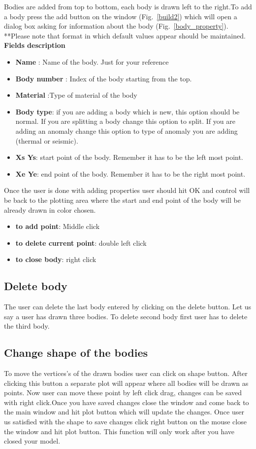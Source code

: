 \documentclass[12pt]{article}
\begin{document}
Bodies are added from top to bottom, each body is drawn left to the right.To add a body press the add button on the window (Fig.~\ref{build2}) which will open a dialog box asking for information about the body (Fig.~\ref{body_property}).\\ 
**Please note that format in which default values appear should be maintained.
\textbf{Fields description}
\begin{itemize}
\item \textbf{Name}     : Name of the body. Just for your reference
\item \textbf{Body number} : Index of the body starting from the top.
\item \textbf{Material} :Type of material of the body
\item \textbf{Body type}: if you are adding a body which is new, this option should be normal. If you are splitting a body change this option to split. If you are adding an anomaly change this option to type of anomaly you are adding (thermal or seismic).
\item \textbf{Xs Ys}: start point of the body. Remember it has to be the left most point. 
\item \textbf{Xe Ye}: end point of the body. Remember it has to be the right most point. 
\end{itemize}
Once the user is done with adding properties user should hit OK and control will be back to the plotting area where the start and end point of the body will be already drawn in color chosen.
\begin{itemize}
\item \textbf{to add point}: Middle click
\item \textbf{to delete current point}: double left click
\item \textbf{to close body}: right click
\end{itemize} 
\subsection{Delete body}
The user can delete the last body entered by clicking on the delete button. Let us say a user has drawn three bodies. To delete second body first user has to delete the third body.
\subsection{Change shape of the bodies}
To move the vertices's of the drawn bodies user can click on shape button. After clicking this button a separate plot will appear where all bodies will be drawn as points. Now user can move these point by left click drag, changes can be saved with right click.Once you have saved changes close the window and come back to the main window and hit plot button which will update the changes. Once user us satisfied with the shape to save changes click right button on the mouse close the window and hit plot button. This function will only work after you have closed your model. 
\end{document}
